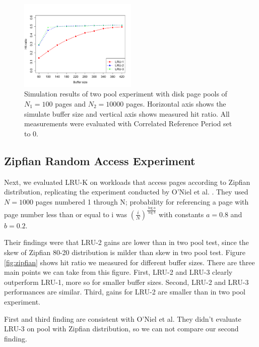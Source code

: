 \begin{figure}[t!]
    \centering
	\includegraphics[width=0.5\textwidth]{./figures/two_pool.pdf}
	\caption{Simulation results of two pool experiment with disk page pools of $N_1 = 100$ pages and $N_2 = 10000$ pages. Horizontal axis shows the simulate buffer size and vertical axis shows measured hit ratio. All measurements were evaluated with Correlated Reference Period set to 0.}
	\label{fig:two_pool}
\end{figure}


\subsection{Zipfian Random Access Experiment}

Next, we evaluated LRU-K on workloads that access pages according to Zipfian distribution, replicating the experiment conducted by O'Niel et al. \cite{lruk}. They used $N = 1000$ pages numbered 1 through N; probability for referencing a page with page number less than or equal to i was $\left(\frac{i}{N}\right)^\frac{\log{a}}{\log{b}}$ with constants $a = 0.8$ and $b = 0.2$.

Their findings were that LRU-2 gains are lower than in two pool test, since the skew of Zipfian 80-20 distribution is milder than skew in two pool test. Figure \ref{fig:zipfian} shows hit ratio we measured for different buffer sizes. There are three main points we can take from this figure. First, LRU-2 and LRU-3 clearly outperform LRU-1, more so for smaller buffer sizes. Second, LRU-2 and LRU-3 performances are similar. Third, gains for LRU-2 are smaller than in two pool experiment.

First and third finding are consistent with O'Niel et al. They didn't evaluate LRU-3 on pool with Zipfian distribution, so we can not compare our second finding.

